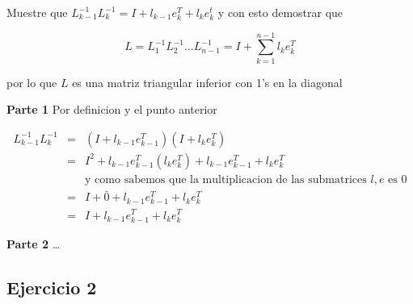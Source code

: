 \documentclass[11pt]{article}
\begin{document}
Muestre que \(L^{-1}_{k-1}L^{-1}_k = I + l_{k-1}e^T_k + l_ke^t_k\) y con
esto demostrar que

\begin{equation*} L = L^{-1}_1 L^{-1}_2 \dots L^{-1}_{n-1} = I + \sum_{k=1}^{n-1}l_ke_k^T
\end{equation*}

por lo que \(L\) es una matriz triangular inferior con 1's en la
diagonal

    \textbf{Parte 1} Por definicion y el punto anterior

\begin{eqnarray*}
    L_{k-1}^{-1}L_{k}^{-1} &=& (I + l_{k-1}e_{k-1}^T)(I + l_ke_k^T) \\
        &=& I^2 + l_{k-1}e_{k-1}^T(l_ke_k^T) + l_{k-1}e_{k-1}^T + l_ke_k^T \\
        &&\text{y como sabemos que la multiplicacion de las submatrices $l,e$ es 0} \\
        &=& I + \bar{0} + l_{k-1}e_{k-1}^T + l_ke_k^T \\
        &=& I + l_{k-1}e_{k-1}^T + l_ke_k^T 
\end{eqnarray*}

\textbf{Parte 2} \ldots{}















\newpage
    \hypertarget{ejercicio-2}{%
\subsection{Ejercicio 2}\label{ejercicio-2}}
\end{document}

